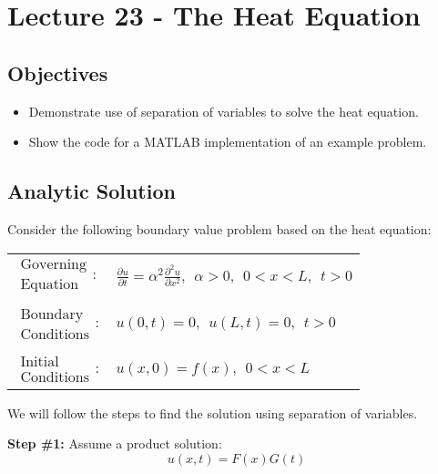 \chapter{Lecture 23 - The Heat Equation}
\label{ch:lec23}
\section{Objectives}
\begin{itemize}
\item Demonstrate use of separation of variables to solve the heat equation.
\item Show the code for a MATLAB implementation of an example problem.
\end{itemize}
\section{Analytic Solution}
Consider the following boundary value problem based on the heat equation:
\begin{table}
\begin{tabular}{l l}
$\substack{\text{Governing} \\\text{Equation}}: $& $\frac{\partial u}{\partial t} = \alpha^2 \frac{\partial^2 u}{\partial x^2}, \ \ \alpha>0, \ \ 0<x<L, \ \ t>0$ \\
& \\
$\substack{\text{Boundary} \\ \text{Conditions}}: $& $u(0,t)=0, \ \ u(L,t) = 0, \ \ t>0$\\
& \\
$\substack{\text{Initial} \\ \text{Conditions}}: $ & $u(x,0) = f(x), \ \ 0<x<L $ \\
\end{tabular}
\end{table}

\vspace{0.25cm}

\noindent We will follow the steps to find the solution using separation of variables.

\vspace{0.5cm}

\noindent\textbf{Step \#1:} Assume a product solution:
\begin{equation*}
u(x,t) = F(x)G(t)
\end{equation*}

